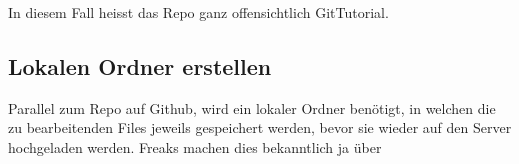 \documentclass[twoside, 11pr]{article}
\begin{document}
\begin{figure}[!tbph]
\end{figure}

\noindent
In diesem Fall heisst das Repo ganz offensichtlich GitTutorial.

\subsection{Lokalen Ordner erstellen}
Parallel zum Repo auf Github, wird ein lokaler Ordner benötigt, in welchen die zu bearbeitenden Files jeweils gespeichert werden, bevor sie wieder auf den Server hochgeladen werden. Freaks machen dies bekanntlich ja über
\end{document}
